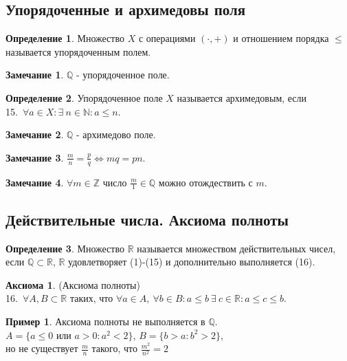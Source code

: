 \documentclass[a4paper, 12pt]{article}
\newcommand{\Z}{\mathbb{Z}}
\newcommand{\N}{\mathbb{N}}
\newcommand{\R}{\mathbb{R}}
\newcommand{\Q}{\mathbb{Q}}
\theoremstyle{definition}
\newtheorem*{definition}{Определение}
\newtheorem*{comm}{Замечание}
\newtheorem*{example}{Пример}
\newtheorem*{axiom}{Аксиома}
\begin{document}
    \subsection{Упорядоченные и архимедовы поля}    
        \begin{definition}
            Множество $X$ с операциями $(\cdot, +)$ и отношением порядка $\leq$ называется упорядоченным полем.
        \end{definition}
        \begin{comm}
            $\Q$ - упорядоченное поле.
        \end{comm}  
        \begin{definition}
            Упорядоченное поле $X$ называется архимедовым, если\\
            15.\ $\forall a\in X: \exists\ n\in \N: a\leq n$.
        \end{definition}
        \begin{comm}
            $\Q$ - архимедово поле.
        \end{comm} 
        \begin{comm}
            $\frac{m}{n}=\frac{p}{q} \Leftrightarrow mq=pn$.
        \end{comm}
        \begin{comm}
            $\forall m\in \Z$ число $\frac{m}{1}\in \Q$ можно отождествить с $m$.
        \end{comm}
    \subsection{Действительные числа. Аксиома полноты}
        \begin{definition}
            Множество $\R$ называется множеством действительных чисел, если $\Q \subset \R$, $\R$ удовлетворяет (1)-(15) и дополнительно выполняется (16).
        \end{definition}
        \begin{axiom} (Аксиома полноты)\\
            16.\ $\forall A,B\subset \R$ таких, что $\forall a\in A,\ \forall b\in B: a\leq b \ \exists \ c\in \R: a\leq c\leq b$.
        \end{axiom}
        \begin{example}
        Аксиома полноты не выполняется в $\Q$.\\
        $A=\{a\leq 0$ или $a>0: a^2<2\}$, $B=\{b>a: b^2>2\}$,\\
        но не существует $\frac{m}{n}$ такого, что $\frac{m^2}{n^2}=2$
        \end{example}
\end{document}
